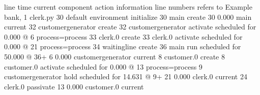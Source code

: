 \documentclass[letterpaper,10pt,english]{sphinxmanual}
\begin{document}
%
\begin{sphinxVerbatim}[commandchars=\\\{\}]
line\PYGZsh{}         time current component    action                               information
\PYGZhy{}\PYGZhy{}\PYGZhy{}\PYGZhy{}\PYGZhy{}   \PYGZhy{}\PYGZhy{}\PYGZhy{}\PYGZhy{}\PYGZhy{}\PYGZhy{}\PYGZhy{}\PYGZhy{}\PYGZhy{}\PYGZhy{} \PYGZhy{}\PYGZhy{}\PYGZhy{}\PYGZhy{}\PYGZhy{}\PYGZhy{}\PYGZhy{}\PYGZhy{}\PYGZhy{}\PYGZhy{}\PYGZhy{}\PYGZhy{}\PYGZhy{}\PYGZhy{}\PYGZhy{}\PYGZhy{}\PYGZhy{}\PYGZhy{}\PYGZhy{}\PYGZhy{} \PYGZhy{}\PYGZhy{}\PYGZhy{}\PYGZhy{}\PYGZhy{}\PYGZhy{}\PYGZhy{}\PYGZhy{}\PYGZhy{}\PYGZhy{}\PYGZhy{}\PYGZhy{}\PYGZhy{}\PYGZhy{}\PYGZhy{}\PYGZhy{}\PYGZhy{}\PYGZhy{}\PYGZhy{}\PYGZhy{}\PYGZhy{}\PYGZhy{}\PYGZhy{}\PYGZhy{}\PYGZhy{}\PYGZhy{}\PYGZhy{}\PYGZhy{}\PYGZhy{}\PYGZhy{}\PYGZhy{}\PYGZhy{}\PYGZhy{}\PYGZhy{}\PYGZhy{}  \PYGZhy{}\PYGZhy{}\PYGZhy{}\PYGZhy{}\PYGZhy{}\PYGZhy{}\PYGZhy{}\PYGZhy{}\PYGZhy{}\PYGZhy{}\PYGZhy{}\PYGZhy{}\PYGZhy{}\PYGZhy{}\PYGZhy{}\PYGZhy{}\PYGZhy{}\PYGZhy{}\PYGZhy{}\PYGZhy{}\PYGZhy{}\PYGZhy{}\PYGZhy{}\PYGZhy{}\PYGZhy{}\PYGZhy{}\PYGZhy{}\PYGZhy{}\PYGZhy{}\PYGZhy{}\PYGZhy{}\PYGZhy{}\PYGZhy{}\PYGZhy{}\PYGZhy{}\PYGZhy{}\PYGZhy{}\PYGZhy{}\PYGZhy{}\PYGZhy{}\PYGZhy{}\PYGZhy{}\PYGZhy{}\PYGZhy{}\PYGZhy{}\PYGZhy{}\PYGZhy{}\PYGZhy{}
                                        line numbers refers to               Example \PYGZhy{} bank, 1 clerk.py
   30                                   default environment initialize
   30                                   main create
   30        0.000 main                 current
   32                                   customergenerator create
   32                                   customergenerator activate           scheduled for      0.000 @    6  process=process
   33                                   clerk.0 create
   33                                   clerk.0 activate                     scheduled for      0.000 @   21  process=process
   34                                   waitingline create
   36                                   main run                             scheduled for     50.000 @   36+
    6        0.000 customergenerator    current
    8                                   customer.0 create
    8                                   customer.0 activate                  scheduled for      0.000 @   13  process=process
    9                                   customergenerator hold               scheduled for     14.631 @    9+
   21        0.000 clerk.0              current
   24                                   clerk.0 passivate
   13        0.000 customer.0           current

\end{sphinxVerbatim}
\end{document}
